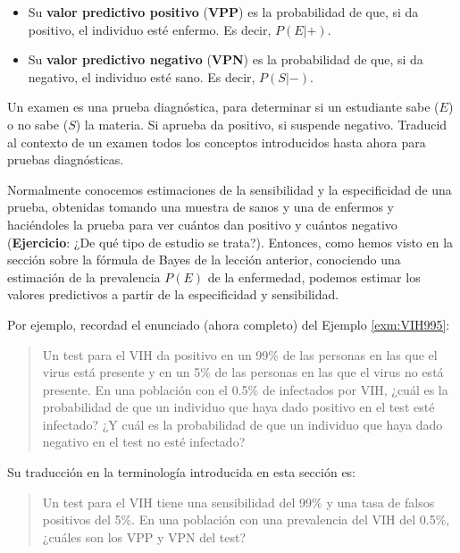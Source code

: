 \documentclass[
]{book}
\theoremstyle{definition}
\theoremstyle{definition}
\theoremstyle{definition}
\theoremstyle{definition}
\theoremstyle{remark}
\begin{document}
\begin{itemize}
\item
  Su \textbf{valor predictivo positivo} (\textbf{VPP}) es la probabilidad de que, si da positivo, el individuo esté enfermo. Es decir, \(P(E|+)\).
\item
  Su \textbf{valor predictivo negativo} (\textbf{VPN}) es la probabilidad de que, si da negativo, el individuo esté sano. Es decir, \(P(S|-)\).
\end{itemize}

\begin{rmdexercici}
Un examen es una prueba diagnóstica, para determinar si un estudiante sabe (\(E\)) o no sabe (\(S\)) la materia. Si aprueba da positivo, si suspende negativo. Traducid al contexto de un examen todos los conceptos introducidos hasta ahora para pruebas diagnósticas.
\end{rmdexercici}

Normalmente conocemos estimaciones de la sensibilidad y la especificidad de una prueba, obtenidas tomando una muestra de sanos y una de enfermos y haciéndoles la prueba para ver cuántos dan positivo y cuántos negativo (\textbf{Ejercicio}: ¿De qué tipo de estudio se trata?). Entonces, como hemos visto en la sección sobre la fórmula de Bayes de la lección anterior, conociendo una estimación de la prevalencia \(P(E)\) de la enfermedad, podemos estimar los valores predictivos a partir de la especificidad y sensibilidad.

Por ejemplo, recordad el enunciado (ahora completo) del Ejemplo \ref{exm:VIH995}:

\begin{quote}
Un test para el VIH da positivo en un 99\% de las personas en las que el virus está presente y en un 5\% de las personas en las que el virus no está presente. En una población con el 0.5\% de infectados por VIH, ¿cuál es la probabilidad de que un individuo que haya dado positivo en el test esté infectado? ¿Y cuál es la probabilidad de que un individuo que haya dado negativo en el test no esté infectado?
\end{quote}

Su traducción en la terminología introducida en esta sección es:

\begin{quote}
Un test para el VIH tiene una sensibilidad del 99\% y una tasa de falsos positivos del 5\%. En una población con una prevalencia del VIH del 0.5\%, ¿cuáles son los VPP y VPN del test?
\end{quote}
\end{document}
